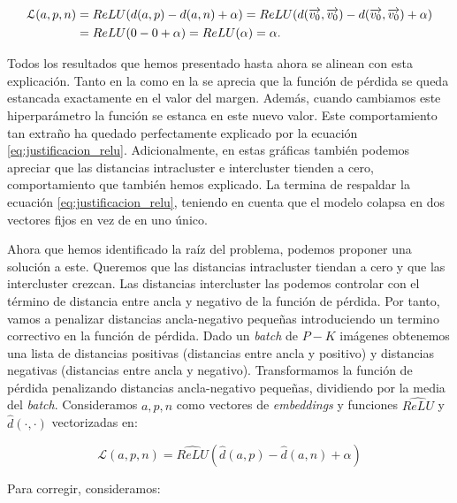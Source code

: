 \begin{equation} \label{eq:justificacion_relu}
\begin{split}
    \mathcal{L}(a, p, n) &= ReLU(d(a, p) - d(a, n) + \alpha) = ReLU(d(\overrightarrow{v_0}, \overrightarrow{v_0}) - d(\overrightarrow{v_0}, \overrightarrow{v_0}) + \alpha) \\
    &= ReLU(0 - 0 + \alpha) = ReLU(\alpha) = \alpha.
\end{split}
\end{equation}

Todos los resultados que hemos presentado hasta ahora se alinean con esta explicación. Tanto en la  como en la  se aprecia que la función de pérdida se queda estancada exactamente en el valor del margen. Además, cuando cambiamos este hiperparámetro la función se estanca en este nuevo valor. Este comportamiento tan extraño ha quedado perfectamente explicado por la ecuación \eqref{eq:justificacion_relu}. Adicionalmente, en estas gráficas también podemos apreciar que las distancias intracluster e intercluster tienden a cero, comportamiento que también hemos explicado. La  termina de respaldar la ecuación \eqref{eq:justificacion_relu}, teniendo en cuenta que el modelo colapsa en dos vectores fijos en vez de en uno único.

Ahora que hemos identificado la raíz del problema, podemos proponer una solución a este. Queremos que las distancias intracluster tiendan a cero y que las intercluster crezcan. Las distancias intercluster las podemos controlar con el término de distancia entre ancla y negativo de la función de pérdida. Por tanto, vamos a penalizar distancias ancla-negativo pequeñas introduciendo un termino correctivo en la función de pérdida. Dado un \textit{batch} de $P-K$ imágenes obtenemos una lista de distancias positivas (distancias entre ancla y positivo) y distancias negativas (distancias entre ancla y negativo). Transformamos la función de pérdida penalizando distancias ancla-negativo pequeñas, dividiendo por la media del \textit{batch}. Consideramos $a, p, n$ como vectores de \textit{embeddings} y funciones $\hat{ReLU}$ y $\hat{d}(\cdot, \cdot)$ vectorizadas en:

\begin{equation}
    \mathcal{L}(a, p, n) = \hat{ReLU}(\hat{d}(a, p) - \hat{d}(a, n) + \alpha)
\end{equation}

Para corregir, consideramos:

